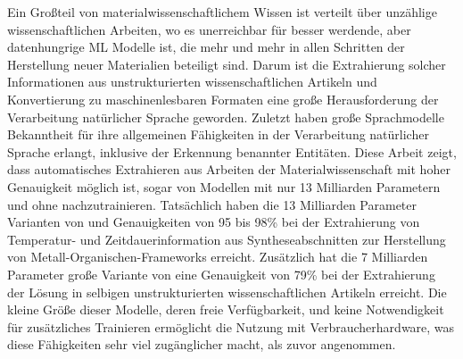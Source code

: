 
Ein Großteil von materialwissenschaftlichem Wissen ist verteilt über unzählige wissen\-schaft\-lichen Arbeiten, wo es unerreichbar für besser werdende, aber datenhungrige \acrlong{ML} Modelle ist, die mehr und mehr in allen Schritten der Herstellung neuer Materialien beteiligt sind.
Darum ist die Extrahierung solcher Informationen aus unstrukturierten wissenschaftlichen Artikeln und Konvertierung zu maschinenlesbaren Formaten eine große Herausforderung der Verarbeitung natürlicher Sprache geworden.
Zuletzt haben große Sprachmodelle Bekanntheit für ihre allgemeinen Fähigkeiten in der Verarbeitung natürlicher Sprache erlangt, inklusive der Erkennung benannter Entitäten.
Diese Arbeit zeigt, dass automatisches Extrahieren aus Arbeiten der Materialwissenschaft mit hoher Genauigkeit möglich ist, sogar von Modellen mit nur 13 Milliarden Parametern und ohne nachzutrainieren.
Tatsächlich haben die 13 Milliarden Parameter Varianten von  und  Genauigkeiten von 95 bis 98\% bei der Extrahierung von Temperatur- und Zeitdauerinformation aus Syntheseabschnitten zur Herstellung von Metall-Organischen-Frameworks erreicht.
Zusätzlich hat die 7 Milliarden Parameter große Variante von  eine Genauigkeit von 79\% bei der Extrahierung der Lösung in selbigen unstrukturierten wissenschaftlichen Artikeln erreicht.
Die kleine Größe dieser Modelle, deren freie Verfügbarkeit, und keine Notwendigkeit für zusätzliches Trainieren ermöglicht die Nutzung mit Verbraucherhardware, was diese Fähigkeiten sehr viel zugänglicher macht, als zuvor angenommen.

\cleardoublepage



